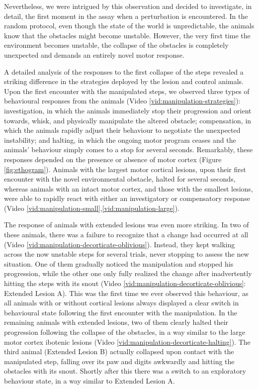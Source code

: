 Nevertheless, we were intrigued by this observation and decided to investigate, in detail, the first moment in the assay when a perturbation is encountered. In the random protocol, even though the state of the world is unpredictable, the animals know that the obstacles might become unstable. However, the very first time the environment becomes unstable, the collapse of the obstacles is completely unexpected and demands an entirely novel motor response.

A detailed analysis of the responses to the first collapse of the steps revealed a striking difference in the strategies deployed by the lesion and control animals. Upon the first encounter with the manipulated steps, we observed three types of behavioural responses from the animals (Video \ref{vid:manipulation-strategies}): investigation, in which the animals immediately stop their progression and orient towards, whisk, and physically manipulate the altered obstacle; compensation, in which the animals rapidly adjust their behaviour to negotiate the unexpected instability; and halting, in which the ongoing motor program ceases and the animals' behaviour simply comes to a stop for several seconds. Remarkably, these responses depended on the presence or absence of motor cortex (Figure \ref{fig:ethogram}). Animals with the largest motor cortical lesions, upon their first encounter with the novel environmental obstacle, halted for several seconds, whereas animals with an intact motor cortex, and those with the smallest lesions, were able to rapidly react with either an investigatory or compensatory response (Video \ref{vid:manipulation-small},\ref{vid:manipulation-large}).

The response of animals with extended lesions was even more striking. In two of these animals, there was a failure to recognize that a change had occurred at all (Video \ref{vid:manipulation-decorticate-oblivious}). Instead, they kept walking across the now unstable steps for several trials, never stopping to assess the new situation. One of them gradually noticed the manipulation and stopped his progression, while the other one only fully realized the change after inadvertently hitting the steps with its snout (Video \ref{vid:manipulation-decorticate-oblivious}: Extended Lesion A). This was the first time we ever observed this behaviour, as all animals with or without cortical lesions always displayed a clear switch in behavioural state following the first encounter with the manipulation. In the remaining animals with extended lesions, two of them clearly halted their progression following the collapse of the obstacles, in a way similar to the large motor cortex ibotenic lesions (Video \ref{vid:manipulation-decorticate-halting}). The third animal (Extended Lesion B) actually collapsed upon contact with the manipulated step, falling over its paw and digits awkwardly and hitting the obstacles with its snout. Shortly after this there was a switch to an exploratory behaviour state, in a way similar to Extended Lesion A.

